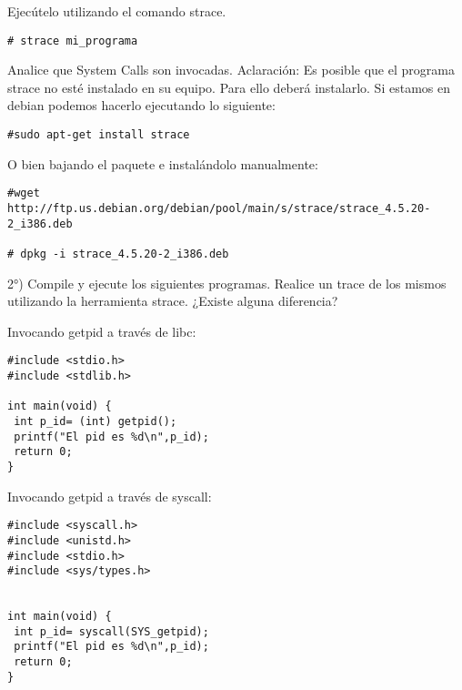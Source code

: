 Ejecútelo utilizando el comando strace.

\begin{verbatim}
# strace mi_programa
\end{verbatim}


Analice que System Calls son invocadas.
Aclaración: 
Es posible que el programa strace no esté instalado en su equipo. Para ello deberá instalarlo. Si estamos en debian podemos hacerlo ejecutando lo siguiente:

\begin{verbatim}
#sudo apt-get install strace
\end{verbatim}

O bien bajando el paquete e instalándolo manualmente:

\begin{verbatim}
#wget http://ftp.us.debian.org/debian/pool/main/s/strace/strace_4.5.20-2_i386.deb

# dpkg -i strace_4.5.20-2_i386.deb
\end{verbatim}

2°) Compile y ejecute los siguientes programas. Realice un trace de los mismos utilizando la herramienta strace. ¿Existe alguna diferencia?

Invocando getpid a través de libc:

\begin{verbatim}
#include <stdio.h>
#include <stdlib.h>
 
int main(void) {
 int p_id= (int) getpid();
 printf("El pid es %d\n",p_id);
 return 0;
}
\end{verbatim}

Invocando getpid a través de syscall:
\begin{verbatim}
#include <syscall.h>
#include <unistd.h>
#include <stdio.h>
#include <sys/types.h>

 
int main(void) {
 int p_id= syscall(SYS_getpid);
 printf("El pid es %d\n",p_id);
 return 0;
}
\end{verbatim}
